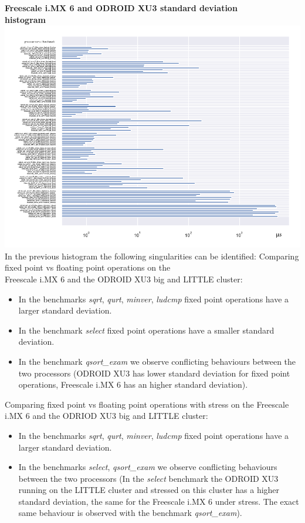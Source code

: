 \clearpage
\textbf{Freescale i.MX 6 and ODROID XU3 standard deviation\\ histogram}\newline
\hspace*{-3.2cm}
\includegraphics[width=570pt]{boards_stddev_histogram.pdf}\\[4cm]
In the previous histogram the following singularities can be identified:
Comparing fixed point vs floating point operations on the \\ Freescale i.MX 6 and the ODROID XU3 big and LITTLE cluster:
\begin{itemize}
		\item In the benchmarks \textit{sqrt}, \textit{qurt}, \textit{minver}, \textit{ludcmp} fixed point operations have a larger standard deviation.
		\item In the benchmark \textit{select} fixed point operations have a smaller standard deviation.
		\item In the benchmark \textit{qsort\_exam} we observe conflicting behaviours between the two processors (ODROID XU3 has lower standard deviation for fixed point operations, Freescale i.MX 6 has an higher standard deviation).
\end{itemize}
Comparing fixed point vs floating point operations with stress on the Freescale i.MX 6 and the ODRIOD XU3 big and LITTLE cluster:
\begin{itemize}
		\item In the benchmarks \textit{sqrt}, \textit{qurt}, \textit{minver}, \textit{ludcmp} fixed point operations have a larger standard deviation.
		\item In the benchmarks \textit{select}, \textit{qsort\_exam} we observe conflicting behaviours between the two processors (In the \textit{select} benchmark the ODROID XU3 running on the LITTLE cluster and stressed on this cluster has a higher standard deviation, the same for the Freescale i.MX 6 under stress. The exact same behaviour is observed with the benchmark \textit{qsort\_exam}).
\end{itemize}

